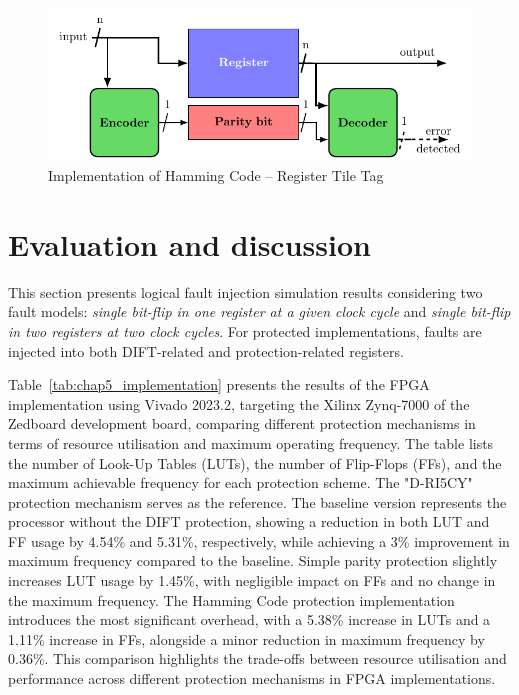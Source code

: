 \begin{figure}[ht]
    \centering
    \includegraphics[page=3, width=\textwidth]{c5_countermeasures_dift/img/archi_contremesures.pdf}
    \caption{Implementation of Hamming Code -- Register Tile Tag}
    \label{fig:implementation_hc_2}
\end{figure}

\section{Evaluation and discussion}

This section presents logical fault injection simulation results considering two fault models: \textit{single bit-flip in one register at a given clock cycle} and \textit{single bit-flip in two registers at two clock cycles}. For protected implementations, faults are injected into both DIFT-related and protection-related registers.

Table~\ref{tab:chap5_implementation} presents the results of the FPGA implementation using Vivado 2023.2, targeting the Xilinx Zynq-7000 of the Zedboard development board, comparing different protection mechanisms in terms of resource utilisation and maximum operating frequency. The table lists the number of Look-Up Tables (LUTs), the number of Flip-Flops (FFs), and the maximum achievable frequency for each protection scheme. The "D-RI5CY" protection mechanism serves as the reference. The baseline version represents the processor without the DIFT protection, showing a reduction in both LUT and FF usage by 4.54\% and 5.31\%, respectively, while achieving a 3\% improvement in maximum frequency compared to the baseline.
Simple parity protection slightly increases LUT usage by 1.45\%, with negligible impact on FFs and no change in the maximum frequency. The Hamming Code protection implementation introduces the most significant overhead, with a 5.38\% increase in LUTs and a 1.11\% increase in FFs, alongside a minor reduction in maximum frequency by 0.36\%.
This comparison highlights the trade-offs between resource utilisation and performance across different protection mechanisms in FPGA implementations.

